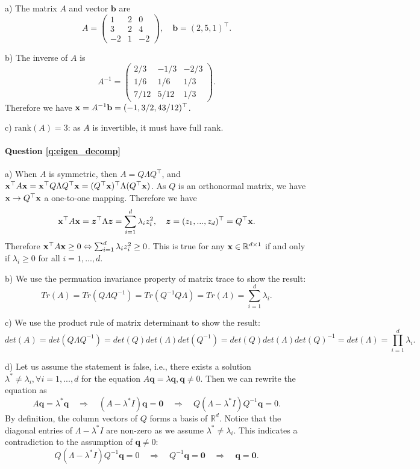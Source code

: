 a) The matrix $A$ and vector $\mathbf{b}$ are
\begin{equation*}
A = \begin{pmatrix}
1 & 2 & 0 \\
3 & 2 & 4 \\
-2 & 1 & -2
\end{pmatrix}, \quad \mathbf{b} = (2, 5, 1)^\top.
\end{equation*}

b) The inverse of $A$ is 
\begin{equation*}
A^{-1} = \begin{pmatrix}
2/3 & -1/3 & -2/3 \\
1/6 & 1/6 & 1/3 \\
7/12 & 5/12 & 1/3
\end{pmatrix}.
\end{equation*}
Therefore we have $\mathbf{x} = A^{-1} \mathbf{b} = (-1, 3/2, 43/12)^\top$.

c) $\text{rank}(A) = 3$: as $A$ is invertible, it must have full rank.

\paragraph{Question \ref{q:eigen_decomp}}

a) When $A$ is symmetric, then $A = Q \Lambda Q^\top$, and $\mathbf{x}^\top A \mathbf{x} = \mathbf{x}^\top Q \Lambda Q^\top \mathbf{x} = (Q^\top \mathbf{x})^\top \Lambda (Q^\top \mathbf{x})$. As $Q$ is an orthonormal matrix, we have $\mathbf{x} \rightarrow Q^\top \mathbf{x}$ a one-to-one mapping. Therefore we have
$$\mathbf{x}^\top A \mathbf{x} = \bm{z}^\top \Lambda \bm{z} = \sum_{i=1}^d \lambda_i z_i^2, \quad \bm{z} = (z_1, ..., z_d)^\top = Q^\top \mathbf{x}.$$
Therefore $\mathbf{x}^\top A \mathbf{x} \geq 0 \Leftrightarrow \sum_{i=1}^d \lambda_i z_i^2 \geq 0$. This is true for any $\mathbf{x} \in \mathbb{R}^{d \times 1}$ if and only if $\lambda_i \geq 0$ for all $i = 1,..., d$.

b) We use the permuation invariance property of matrix trace to show the result:
$$Tr(A) = Tr(Q \Lambda Q^{-1}) = Tr(Q^{-1} Q \Lambda) = Tr(\Lambda) = \sum_{i=1}^d \lambda_i.$$

c) We use the product rule of matrix determinant to show the result:
$$det(A) = det(Q \Lambda Q^{-1}) = det(Q) det(\Lambda) det(Q^{-1}) = det(Q) det(\Lambda) det(Q)^{-1} = det(\Lambda) = \prod_{i=1}^d \lambda_i.$$

d) Let us assume the statement is false, i.e., there exists a solution $\lambda^* \neq \lambda_i, \forall i = 1, ..., d$ for the equation $A \bm{q} = \lambda \bm{q}, \bm{q} \neq 0$. Then we can rewrite the equation as
$$A \bm{q} = \lambda^* \bm{q} \quad \Rightarrow \quad (A - \lambda^* I) \bm{q} = \bm{0} \quad \Rightarrow \quad Q (\Lambda - \lambda^* I) Q^{-1} \bm{q} = 0.$$
By definition, the column vectors of $Q$ forms a basis of $\mathbb{R}^d$. Notice that the diagonal entries of $\Lambda - \lambda^* I$ are non-zero as we assume $\lambda^* \neq \lambda_i$. This indicates a contradiction to the assumption of $\bm{q} \neq 0$:
$$Q (\Lambda - \lambda^* I) Q^{-1} \bm{q} = 0 \quad \Rightarrow \quad Q^{-1}\bm{q} = \bm{0} \quad \Rightarrow \quad \bm{q} = \bm{0}.$$

